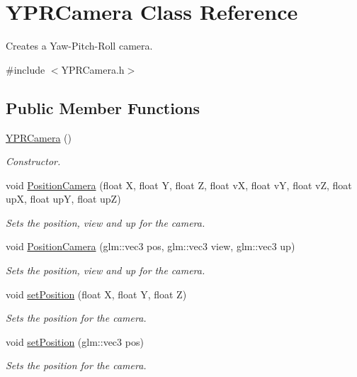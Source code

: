 \hypertarget{class_y_p_r_camera}{}\section{Y\+P\+R\+Camera Class Reference}
\label{class_y_p_r_camera}


Creates a Yaw-\/\+Pitch-\/\+Roll camera.  




{\ttfamily \#include $<$Y\+P\+R\+Camera.\+h$>$}

\subsection*{Public Member Functions}
\begin{DoxyCompactItemize}
\item 
\hyperlink{class_y_p_r_camera_a65230f172270f51a11dec6750ef295d3}{Y\+P\+R\+Camera} ()
\begin{DoxyCompactList}\small\item\em Constructor. \end{DoxyCompactList}\item 
void \hyperlink{class_y_p_r_camera_a82b133d21e8ea170a7877553ad243621}{Position\+Camera} (float X, float Y, float Z, float vX, float vY, float vZ, float upX, float upY, float upZ)
\begin{DoxyCompactList}\small\item\em Sets the position, view and up for the camera. \end{DoxyCompactList}\item 
void \hyperlink{class_y_p_r_camera_a3956419f485ded9249af83864a88745b}{Position\+Camera} (glm\+::vec3 pos, glm\+::vec3 view, glm\+::vec3 up)
\begin{DoxyCompactList}\small\item\em Sets the position, view and up for the camera. \end{DoxyCompactList}\item 
void \hyperlink{class_y_p_r_camera_a2f84f79488d64b59bbed60af935b37cb}{set\+Position} (float X, float Y, float Z)
\begin{DoxyCompactList}\small\item\em Sets the position for the camera. \end{DoxyCompactList}\item 
void \hyperlink{class_y_p_r_camera_a2527de172c8ea8bcc5166a8e725219e9}{set\+Position} (glm\+::vec3 pos)
\begin{DoxyCompactList}\small\item\em Sets the position for the camera. \end{DoxyCompactList}\item 

\end{DoxyCompactItemize}
